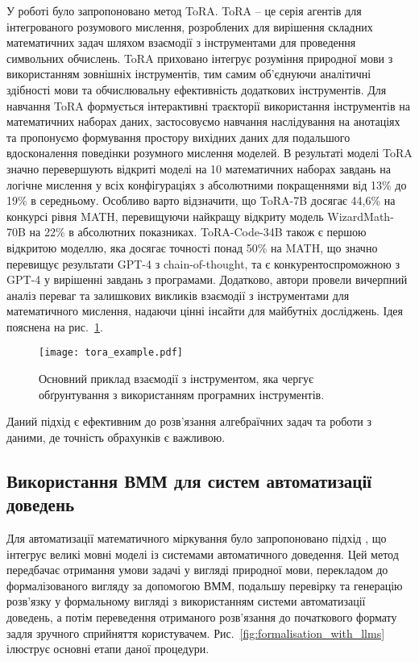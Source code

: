 У роботі \cite{gou2024toratoolintegratedreasoningagent} було запропоновано метод ToRA. ToRA -- це серія агентів для інтегрованого розумового мислення, розроблених для вирішення складних математичних задач шляхом взаємодії з інструментами для проведення символьних обчислень. ToRA приховано інтегрує розуміння природної мови з використанням зовнішніх інструментів, тим самим об'єднуючи аналітичні здібності мови та обчислювальну ефективність додаткових інструментів. Для навчання ToRA формується інтерактивні траєкторії використання інструментів на математичних наборах даних, застосовуємо навчання наслідування на анотаціях та пропонуємо формування простору вихідних даних для подальшого вдосконалення поведінки розумного мислення моделей. В результаті моделі ToRA значно перевершують відкриті моделі на 10 математичних наборах завдань на логічне мислення у всіх конфігураціях з абсолютними покращеннями від 13\% до 19\% в середньому. Особливо варто відзначити, що ToRA-7B досягає 44,6\% на конкурсі рівня MATH, перевищуючи найкращу відкриту модель WizardMath-70B на 22\% в абсолютних показниках. ToRA-Code-34B також є першою відкритою моделлю, яка досягає точності понад 50\% на MATH, що значно перевищує результати GPT-4 з chain-of-thought, та є конкурентоспроможною з GPT-4 у вирішенні завдань з програмами. Додатково, автори провели вичерпний аналіз переваг та залишкових викликів взаємодії з інструментами для математичного мислення, надаючи цінні інсайти для майбутніх досліджень. Ідея пояснена на рис.~\ref{fig:tora-example}.

\begin{figure}[!h]
    \centering
    \texttt{[image: tora\_example.pdf]}
    \caption{Основний приклад взаємодії з інструментом, яка чергує обґрунтування з використанням програмних інструментів.}
    \label{fig:tora-example}
\end{figure}

Даний підхід є ефективним до розв'язання алгебраїчних задач та роботи з даними, де точність обрахунків є важливою.

\subsection{Використання ВММ для систем автоматизації доведень}

Для автоматизації математичного міркування було запропоновано підхід \cite{nikolaiev2024neuralform}, що інтегрує великі мовні моделі із системами автоматичного доведення. Цей метод передбачає отримання умови задачі у вигляді природної мови, перекладом до формалізованого вигляду за допомогою ВММ, подальшу перевірку та генерацію розв’язку у формальному вигляді з використанням системи автоматизації доведень, а потім переведення отриманого розв'язання до початкового формату задля зручного сприйняття користувачем. Рис.~\ref{fig:formalisation_with_llms} ілюструє основні етапи даної процедури.

